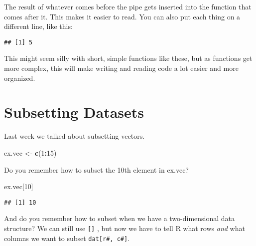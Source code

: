 \documentclass[
]{article}
\newenvironment{Shaded}{\begin{snugshade}}{\end{snugshade}}
\newcommand{\DecValTok}[1]{\textcolor[rgb]{0.00,0.00,0.81}{#1}}
\newcommand{\FunctionTok}[1]{\textcolor[rgb]{0.13,0.29,0.53}{\textbf{#1}}}
\newcommand{\NormalTok}[1]{#1}
\newcommand{\OtherTok}[1]{\textcolor[rgb]{0.56,0.35,0.01}{#1}}
\newcommand{\SpecialCharTok}[1]{\textcolor[rgb]{0.81,0.36,0.00}{\textbf{#1}}}
\begin{document}
The result of whatever comes before the pipe gets inserted into the
function that comes after it. This makes it easier to read. You can also
put each thing on a different line, like this:

\begin{Shaded}
\end{Shaded}

\begin{verbatim}
## [1] 5
\end{verbatim}

This might seem silly with short, simple functions like these, but as
functions get more complex, this will make writing and reading code a
lot easier and more organized.

\hypertarget{subsetting-datasets}{%
\section{Subsetting Datasets}\label{subsetting-datasets}}

Last week we talked about subsetting vectors.

\begin{Shaded}
\begin{Highlighting}[]
\NormalTok{ex.vec }\OtherTok{\textless{}{-}} \FunctionTok{c}\NormalTok{(}\DecValTok{1}\SpecialCharTok{:}\DecValTok{15}\NormalTok{)}
\end{Highlighting}
\end{Shaded}

Do you remember how to subset the 10th element in ex.vec?

\begin{Shaded}
\begin{Highlighting}[]
\NormalTok{ex.vec[}\DecValTok{10}\NormalTok{]}
\end{Highlighting}
\end{Shaded}

\begin{verbatim}
## [1] 10
\end{verbatim}

And do you remember how to subset when we have a two-dimensional data
structure? We can still use \texttt{{[}{]}} , but now we have to tell R
what rows \emph{and} what columns we want to subset
\texttt{dat{[}r\#,\ c\#{]}}.
\end{document}
